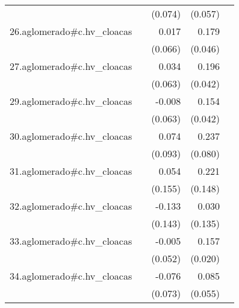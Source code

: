 {\begin{longtable}{l*{4}{D{.}{.}{-1}}}
            &                     &     (0.074)         &     (0.057)         &                     \\
\addlinespace
26.aglomerado#c.hv\_cloacas&                     &       0.017         &       0.179\sym{***}&                     \\
            &                     &     (0.066)         &     (0.046)         &                     \\
\addlinespace
27.aglomerado#c.hv\_cloacas&                     &       0.034         &       0.196\sym{***}&                     \\
            &                     &     (0.063)         &     (0.042)         &                     \\
\addlinespace
29.aglomerado#c.hv\_cloacas&                     &      -0.008         &       0.154\sym{***}&                     \\
            &                     &     (0.063)         &     (0.042)         &                     \\
\addlinespace
30.aglomerado#c.hv\_cloacas&                     &       0.074         &       0.237\sym{**} &                     \\
            &                     &     (0.093)         &     (0.080)         &                     \\
\addlinespace
31.aglomerado#c.hv\_cloacas&                     &       0.054         &       0.221         &                     \\
            &                     &     (0.155)         &     (0.148)         &                     \\
\addlinespace
32.aglomerado#c.hv\_cloacas&                     &      -0.133         &       0.030         &                     \\
            &                     &     (0.143)         &     (0.135)         &                     \\
\addlinespace
33.aglomerado#c.hv\_cloacas&                     &      -0.005         &       0.157\sym{***}&                     \\
            &                     &     (0.052)         &     (0.020)         &                     \\
\addlinespace
34.aglomerado#c.hv\_cloacas&                     &      -0.076         &       0.085         &                     \\
            &                     &     (0.073)         &     (0.055)         &                     \\

\end{longtable}}
